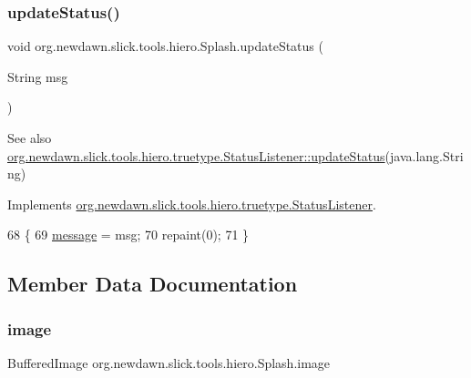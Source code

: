 \subsubsection{\texorpdfstring{update\+Status()}{updateStatus()}}
{\footnotesize\ttfamily void org.\+newdawn.\+slick.\+tools.\+hiero.\+Splash.\+update\+Status (\begin{DoxyParamCaption}\item[{String}]{msg }\end{DoxyParamCaption})\hspace{0.3cm}{\ttfamily [inline]}}

\begin{DoxySeeAlso}{See also}
\mbox{\hyperlink{interfaceorg_1_1newdawn_1_1slick_1_1tools_1_1hiero_1_1truetype_1_1_status_listener_a60c730e33b5466c1801b3e545c8dbd6d}{org.\+newdawn.\+slick.\+tools.\+hiero.\+truetype.\+Status\+Listener\+::update\+Status}}(java.\+lang.\+String) 
\end{DoxySeeAlso}


Implements \mbox{\hyperlink{interfaceorg_1_1newdawn_1_1slick_1_1tools_1_1hiero_1_1truetype_1_1_status_listener_a60c730e33b5466c1801b3e545c8dbd6d}{org.\+newdawn.\+slick.\+tools.\+hiero.\+truetype.\+Status\+Listener}}.


\begin{DoxyCode}
68                                          \{
69         \mbox{\hyperlink{classorg_1_1newdawn_1_1slick_1_1tools_1_1hiero_1_1_splash_a9e7ce871c3624f5153d712d0e38e9312}{message}} = msg;
70         repaint(0);
71     \}
\end{DoxyCode}


\subsection{Member Data Documentation}
\mbox{\label{classorg_1_1newdawn_1_1slick_1_1tools_1_1hiero_1_1_splash_aa7f9bf57a1205b3ed105ae9392f17cff}} 
\subsubsection{\texorpdfstring{image}{image}}
{\footnotesize\ttfamily Buffered\+Image org.\+newdawn.\+slick.\+tools.\+hiero.\+Splash.\+image\hspace{0.3cm}{\ttfamily [private]}}

